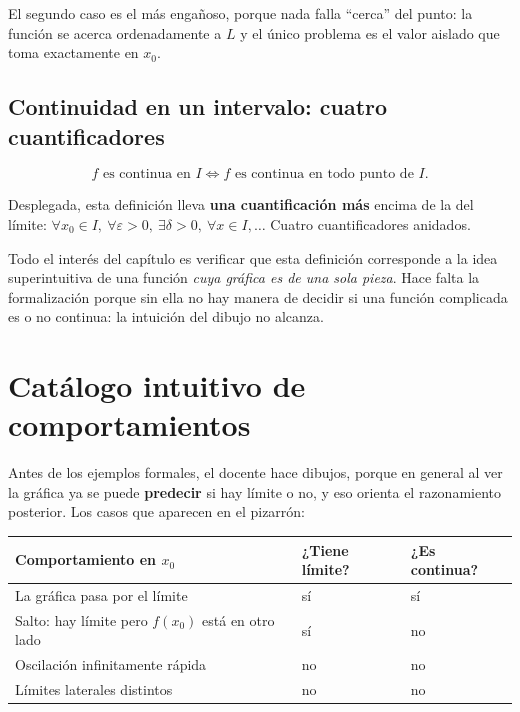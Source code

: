 \documentclass[12pt,a4paper]{article}
\begin{document}
El segundo caso es el más engañoso, porque nada falla ``cerca'' del punto: la
función se acerca ordenadamente a $L$ y el único problema es el valor aislado
que toma exactamente en $x_0$.

\subsection{Continuidad en un intervalo: cuatro cuantificadores}

\[
  f \text{ es continua en } I \iff f \text{ es continua en todo punto de } I.
\]

Desplegada, esta definición lleva \textbf{una cuantificación más} encima de la
del límite: $\forall x_0 \in I,\ \forall \varepsilon > 0,\ \exists \delta > 0,\
\forall x \in I, \dots$ Cuatro cuantificadores anidados.

\begin{notebox}
Todo el interés del capítulo es verificar que esta definición corresponde a la
idea superintuitiva de una función \emph{cuya gráfica es de una sola pieza}.
Hace falta la formalización porque sin ella no hay manera de decidir si una
función complicada es o no continua: la intuición del dibujo no alcanza.
\end{notebox}

\section{Catálogo intuitivo de comportamientos}

Antes de los ejemplos formales, el docente hace dibujos, porque en general al
ver la gráfica ya se puede \textbf{predecir} si hay límite o no, y eso orienta
el razonamiento posterior. Los casos que aparecen en el pizarrón:

\begin{center}
\begin{tabularx}{\textwidth}{@{}Xll@{}}
\toprule
\textbf{Comportamiento en $x_0$} & \textbf{¿Tiene límite?} & \textbf{¿Es continua?} \\
\midrule
La gráfica pasa por el límite & sí & sí \\
Salto: hay límite pero $f(x_0)$ está en otro lado & sí & no \\
Oscilación infinitamente rápida & no & no \\
Límites laterales distintos & no & no \\
\bottomrule
\end{tabularx}
\end{center}
\end{document}
